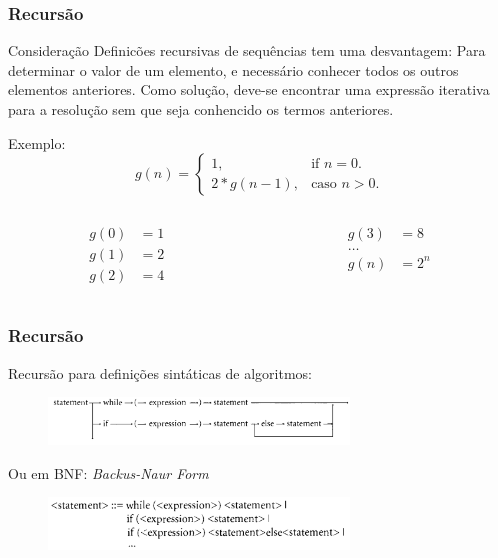 \documentclass[10pt, handout]{beamer}
\begin{document}
\begin{frame}
  \frametitle{Recursão}
  \begin{block}{Consideração}
    Definicões recursivas de sequências tem uma desvantagem: Para determinar o valor de um elemento, e necessário conhecer todos os outros elementos anteriores. Como solução, deve-se encontrar uma expressão iterativa para a resolução sem que seja conhencido os termos anteriores.
  \end{block}
  Exemplo:
  \begin{equation}
    g(n)=\begin{cases}
      1,        & \text{if $n=0$}.     \\
      2*g(n-1), & \text{caso $n > 0$}.
    \end{cases}
  \end{equation}
  \begin{columns}[t]
    \begin{column}{4cm}
      \begin{align*}
        g(0) & = 1 \\
        g(1) & = 2 \\
        g(2) & = 4
      \end{align*}
    \end{column}
    \begin{column}{4cm}
      \begin{align*}
        g(3)   & = 8   \\
        \ldots &       \\
        g(n)   & = 2^n
      \end{align*}
    \end{column}
  \end{columns}
  \vfill
\end{frame}

\begin{frame}
  \frametitle{Recursão}
  Recursão para definições sintáticas de algoritmos:
  \vfill
  \begin{figure}[h]
    \begin{center}
      \includegraphics[width=8cm]{fig/img03}
    \end{center}
  \end{figure}
  \vfill
  Ou em BNF: \emph{Backus-Naur Form}
  \vfill
  \begin{figure}[h]
    \begin{center}
      \includegraphics[width=8cm]{fig/img04}
    \end{center}
  \end{figure}

\end{frame}
\end{document}
